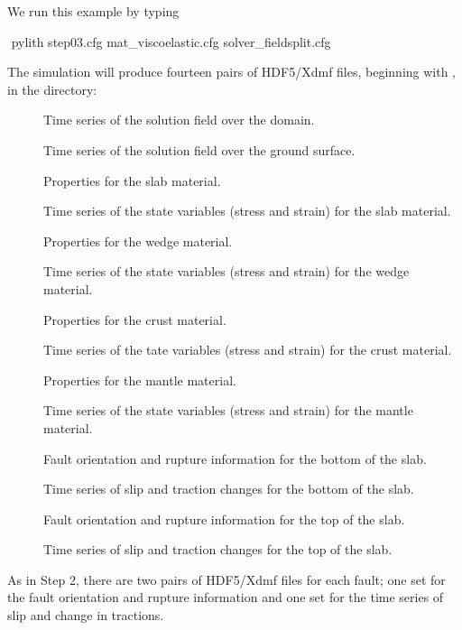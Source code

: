 We run this example by typing
\begin{shell}
$$ pylith step03.cfg mat_viscoelastic.cfg solver_fieldsplit.cfg
\end{shell}
The simulation will produce fourteen pairs of HDF5/Xdmf files,
beginning with , in the 
directory:
\begin{description}
\item[] Time series of the solution field over the domain.
\item[] Time series of the solution field over the ground surface.
\item[] Properties for
  the slab material.
\item[] Time series of the state variables (stress and strain) for the slab material.
\item[] Properties for
  the wedge material.
\item[] Time series of the state variables (stress and strain) for the wedge material.
\item[] Properties for
  the crust material.
\item[] Time series of the tate variables
  (stress and strain) for the crust material.
\item[] Properties for
  the mantle material.
\item[] Time series of the state variables
  (stress and strain) for the mantle material.
\item[] Fault orientation
  and rupture information for the bottom of the slab.
\item[] Time series of slip and
  traction changes for the bottom of the slab.
\item[] Fault orientation
  and rupture information for the top of the slab.
\item[] Time series of slip and
  traction changes for the top of the slab.
\end{description}
As in Step 2, there are two pairs of HDF5/Xdmf files for
each fault; one set for the fault orientation and rupture information
and one set for the time series of slip and change in tractions.

